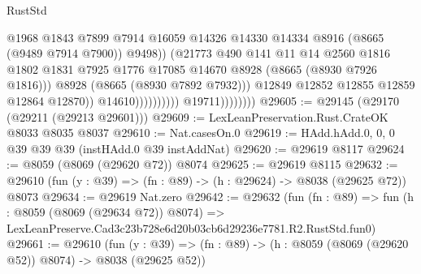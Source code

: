 \begin{lexlean}{RustStd}
\begin{coremodule}
                                                  @1968
                                                  @1843
                                                  @7899
                                                  @7914
                                                  @16059
                                                  @14326
                                                  @14330
                                                  @14334
                                                  @8916
                                                  (@8665 (@9489 @7914 @7900))
                                                  @9498))
                                              (@21773
                                                @490
                                                @141
                                                @11
                                                @14
                                                @2560
                                                @1816
                                                @1802
                                                @1831
                                                @7925
                                                @1776
                                                @17085
                                                @14670
                                                @8928
                                                (@8665 (@8930 @7926 @1816)))
                                              @8928
                                              (@8665 (@8930 @7892 @7932)))
                                            @12849
                                            @12852
                                            @12855
                                            @12859
                                            @12864
                                            @12870))
                                        @14610))))))))))
                    @19711))))))))
@29605 := @29145 (@29170 (@29211 (@29213 @29601)))
@29609 := LexLeanPreservation.Rust.CrateOK @8033 @8035 @8037
@29610 := Nat.casesOn.{0}
@29619 := HAdd.hAdd.{0, 0, 0} @39 @39 @39 (instHAdd.{0} @39 instAddNat)
@29620 := @29619 @8117
@29624 := @8059 (@8069 (@29620 @72)) @8074
@29625 := @29619 @8115
@29632 := @29610 (fun (y : @39) => (fn : @89) -> (h : @29624) -> @8038 (@29625 @72)) @8073
@29634 := @29619 Nat.zero
@29642 := @29632
    (fun (fn : @89) =>
    fun (h : @8059 (@8069 (@29634 @72)) @8074) =>
    LexLeanPreserve.Cad3c23b728e6d20b03cb6d29236e7781.R2.RustStd.fun0)
@29661 := @29610
    (fun (y : @39) => (fn : @89) -> (h : @8059 (@8069 (@29620 @52)) @8074) -> @8038 (@29625 @52))

\end{coremodule}
\end{lexlean}
